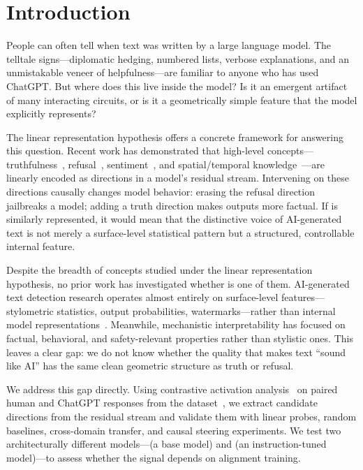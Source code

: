 \section{Introduction}
\label{sec:introduction}

People can often tell when text was written by a large language model.
The telltale signs---diplomatic hedging, numbered lists, verbose explanations, and an unmistakable veneer of helpfulness---are familiar to anyone who has used ChatGPT.
But where does this \aistyle live inside the model?
Is it an emergent artifact of many interacting circuits, or is it a geometrically simple feature that the model explicitly represents?

The linear representation hypothesis offers a concrete framework for answering this question.
Recent work has demonstrated that high-level concepts---truthfulness~\citep{marks2024geometry}, refusal~\citep{arditi2024refusal}, sentiment~\citep{turner2023activation}, and spatial/temporal knowledge~\citep{gurnee2023language}---are linearly encoded as directions in a model's residual stream.
Intervening on these directions causally changes model behavior: erasing the refusal direction jailbreaks a model; adding a truth direction makes outputs more factual.
If \aistyle is similarly represented, it would mean that the distinctive voice of AI-generated text is not merely a surface-level statistical pattern but a structured, controllable internal feature.

Despite the breadth of concepts studied under the linear representation hypothesis, no prior work has investigated whether \aistyle is one of them.
AI-generated text detection research operates almost entirely on surface-level features---stylometric statistics, output probabilities, watermarks---rather than internal model representations~\citep{guo2023hc3}.
Meanwhile, mechanistic interpretability has focused on factual, behavioral, and safety-relevant properties rather than stylistic ones.
This leaves a clear gap: we do not know whether the quality that makes text ``sound like AI'' has the same clean geometric structure as truth or refusal.

We address this gap directly.
Using contrastive activation analysis~\citep{rimsky2024steering, arditi2024refusal} on paired human and ChatGPT responses from the \hcthree dataset~\citep{guo2023hc3}, we extract candidate \aistyle directions from the residual stream and validate them with linear probes, random baselines, cross-domain transfer, and causal steering experiments.
We test two architecturally different models---\pythia (a base model) and \qwen (an instruction-tuned model)---to assess whether the signal depends on alignment training.

